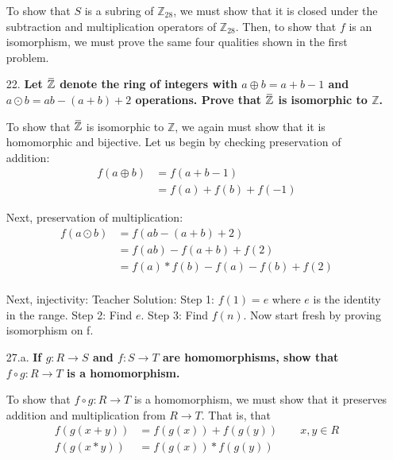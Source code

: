 \documentclass{article}
\newcommand{\overbar}[1]{\mkern 1.5mu\overline{\mkern-1.5mu#1\mkern-1.5mu}\mkern 1.5mu}
\begin{document}
\begin{enumerate}
			To show that $S$ is a subring of $\mathbb{Z}_{28}$, we must show that it is closed under
			the subtraction and multiplication operators of $\mathbb{Z}_{28}$. Then, to show that
			$f$ is an isomorphism, we must prove the same four qualities shown in the first problem.

		\item [22.] \textbf{Let $\overbar{\mathbb{Z}}$ denote the ring of integers with $a 
							\oplus b = a + b - 1$ and $a \odot b = ab - (a + b) + 2$ operations.
							Prove that $\overbar{\mathbb{Z}}$ is isomorphic to $\mathbb{Z}$.}

			To show that $\overbar{\mathbb{Z}}$ is isomorphic to $\mathbb{Z}$, we again must show
			that it is homomorphic and bijective. Let us begin by checking preservation of addition:
			\begin{align*}
				f(a \oplus b) & = f(a + b - 1) \\
							  & = f(a) + f(b) + f(-1)
			\end{align*}

			Next, preservation of multiplication:
			\begin{align*}
				f(a \odot b) & = f(ab - (a + b) + 2) \\
							 & = f(ab) - f(a + b) + f(2) \\
							 & = f(a) * f(b) - f(a) - f(b) + f(2) \\
			\end{align*}

			Next, injectivity:
			Teacher Solution:
				Step 1: $f(1) = e$ where $e$ is the identity in the range. 
				Step 2: Find $e$.
				Step 3: Find $f(n)$.
				Now start fresh by proving isomorphism on f.

		\item [27.a.] \textbf{If $g:R \rightarrow S$ and $f:S \rightarrow T$ are homomorphisms, show
							  that $f \circ g:R \rightarrow T$ is a homomorphism.}		

			To show that $f \circ g:R \rightarrow T$ is a homomorphism, we must show that it 
			preserves addition and multiplication from $R \rightarrow T$. That is, that
			\begin{align*}
				f(g(x + y)) & = f(g(x)) + f(g(y)) \qquad x, y \in R \\
				f(g(x * y)) & = f(g(x)) * f(g(y)) \\
			\end{align*}


\end{enumerate}
\end{document}
